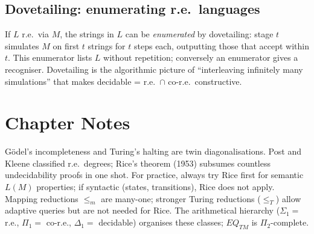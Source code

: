 \subsection{Dovetailing: enumerating r.e.\ languages}
If $L$ r.e.\ via $M$, the strings in $L$ can be \emph{enumerated} by dovetailing: stage $t$ simulates $M$ on first $t$ strings for $t$ steps each, outputting those that accept within $t$. This enumerator lists $L$ without repetition; conversely an enumerator gives a recogniser. Dovetailing is the algorithmic picture of ``interleaving infinitely many simulations'' that makes decidable = r.e.\ $\cap$ co-r.e.\ constructive.

\section{Chapter Notes}
G\"odel's incompleteness and Turing's halting are twin diagonalisations. Post and Kleene classified r.e.\ degrees; Rice's theorem (1953) subsumes countless undecidability proofs in one shot. For practice, always try Rice first for semantic $L(M)$ properties; if syntactic (states, transitions), Rice does not apply.
Mapping reductions $\le_m$ are many-one; stronger Turing reductions ($\le_T$) allow adaptive queries but are not needed for Rice. The arithmetical hierarchy ($\Sigma_1=$ r.e., $\Pi_1=$ co-r.e., $\Delta_1=$ decidable) organises these classes; $EQ_{TM}$ is $\Pi_2$-complete.

